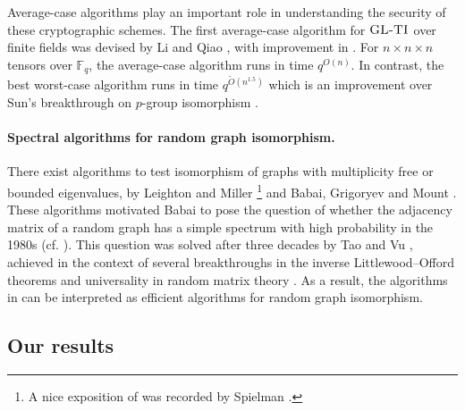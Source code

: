 \documentclass[11pt]{article}
\numberwithin{equation}{section}
\theoremstyle{remark}
\newcommand{\F}{\mathbb{F}}
\newcommand{\GLTI}{\textsc{GL-TI}}
\begin{document}
Average-case algorithms play an important role in understanding the security of these cryptographic schemes. The first average-case algorithm for $\GLTI$ over finite fields was devised by Li and Qiao \cite{LQ17}, with improvement in \cite{BLQW20}. For $n\times n\times n$ tensors over $\F_q$, the average-case algorithm runs in time $q^{O(n)}$. In contrast, the best worst-case algorithm runs in time $q^{\tilde O(n^{1.5})}$ \cite{IMQSZ24} which is an improvement over Sun's breakthrough on $p$-group isomorphism \cite{Sun23}.

\paragraph{Spectral algorithms for random graph isomorphism.} There exist algorithms to test isomorphism of graphs with multiplicity free or bounded eigenvalues, by Leighton and Miller \cite{leighton1979certificates}\footnote{A nice exposition of \cite{leighton1979certificates} was recorded by Spielman \cite{spielman2018testing}.} and Babai, Grigoryev and Mount \cite{babai1982isomorphism,Bab86}. These algorithms motivated Babai to pose the question of whether the adjacency matrix of a random graph has a simple spectrum with high probability in the 1980s (cf. \cite{tao2017random}). This question was solved after three decades by Tao and Vu \cite{tao2017random}, achieved in the context of several breakthroughs in the inverse Littlewood--Offord theorems and universality in random matrix theory \cite{tao2009inverse,tao2011random}. As a result, the algorithms in \cite{leighton1979certificates,babai1982isomorphism,Bab86} can be interpreted as efficient algorithms for random graph isomorphism. 


\subsection{Our results}\label{subsec:results}
\end{document}
